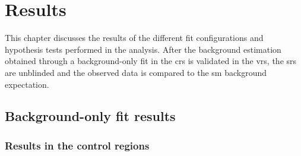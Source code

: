 

\chapter{Results}\label{ch:results}

\ifpdf
    \graphicspath{{chapter-results/Figs/Raster/}{chapter-results/Figs/PDF/}{chapter-results/Figs/}}
\else
    \graphicspath{{chapter-results/Figs/Vector/}{chapter-results/Figs/}}
\fi

This chapter discusses the results of the different fit configurations and hypothesis tests performed in the analysis. After the background estimation obtained through a background-only fit in the \glspl{cr} is validated in the \glspl{vr}, the \glspl{sr} are unblinded and the observed data is compared to the \gls{sm} background expectation.

\section{Background-only fit results}\label{sec:results_background_only}

\subsection{Results in the control regions}

